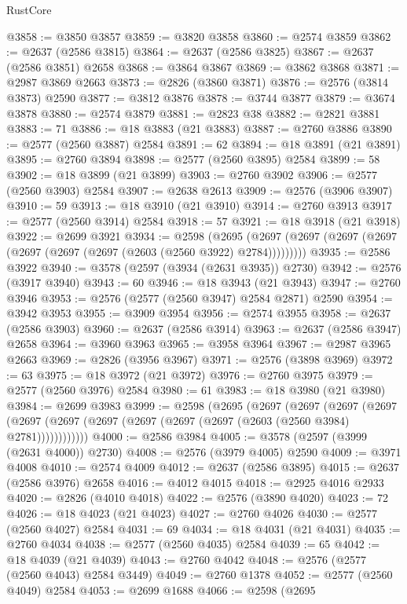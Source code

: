 \begin{lexlean}{RustCore}
\begin{coremodule}
@3858 := @3850 @3857
@3859 := @3820 @3858
@3860 := @2574 @3859
@3862 := @2637 (@2586 @3815)
@3864 := @2637 (@2586 @3825)
@3867 := @2637 (@2586 @3851) @2658
@3868 := @3864 @3867
@3869 := @3862 @3868
@3871 := @2987 @3869 @2663
@3873 := @2826 (@3860 @3871)
@3876 := @2576 (@3814 @3873) @2590
@3877 := @3812 @3876
@3878 := @3744 @3877
@3879 := @3674 @3878
@3880 := @2574 @3879
@3881 := @2823 @38
@3882 := @2821 @3881
@3883 := 71
@3886 := @18 @3883 (@21 @3883)
@3887 := @2760 @3886
@3890 := @2577 (@2560 @3887) @2584
@3891 := 62
@3894 := @18 @3891 (@21 @3891)
@3895 := @2760 @3894
@3898 := @2577 (@2560 @3895) @2584
@3899 := 58
@3902 := @18 @3899 (@21 @3899)
@3903 := @2760 @3902
@3906 := @2577 (@2560 @3903) @2584
@3907 := @2638 @2613
@3909 := @2576 (@3906 @3907)
@3910 := 59
@3913 := @18 @3910 (@21 @3910)
@3914 := @2760 @3913
@3917 := @2577 (@2560 @3914) @2584
@3918 := 57
@3921 := @18 @3918 (@21 @3918)
@3922 := @2699 @3921
@3934 := @2598
    (@2695 (@2697 (@2697 (@2697 (@2697 (@2697 (@2697 (@2697 (@2603 (@2560 @3922) @2784)))))))))
@3935 := @2586 @3922
@3940 := @3578 (@2597 (@3934 (@2631 @3935)) @2730)
@3942 := @2576 (@3917 @3940)
@3943 := 60
@3946 := @18 @3943 (@21 @3943)
@3947 := @2760 @3946
@3953 := @2576 (@2577 (@2560 @3947) @2584 @2871) @2590
@3954 := @3942 @3953
@3955 := @3909 @3954
@3956 := @2574 @3955
@3958 := @2637 (@2586 @3903)
@3960 := @2637 (@2586 @3914)
@3963 := @2637 (@2586 @3947) @2658
@3964 := @3960 @3963
@3965 := @3958 @3964
@3967 := @2987 @3965 @2663
@3969 := @2826 (@3956 @3967)
@3971 := @2576 (@3898 @3969)
@3972 := 63
@3975 := @18 @3972 (@21 @3972)
@3976 := @2760 @3975
@3979 := @2577 (@2560 @3976) @2584
@3980 := 61
@3983 := @18 @3980 (@21 @3980)
@3984 := @2699 @3983
@3999 := @2598
    (@2695
      (@2697
        (@2697
          (@2697
            (@2697 (@2697 (@2697 (@2697 (@2697 (@2697 (@2697 (@2603 (@2560 @3984) @2781))))))))))))
@4000 := @2586 @3984
@4005 := @3578 (@2597 (@3999 (@2631 @4000)) @2730)
@4008 := @2576 (@3979 @4005) @2590
@4009 := @3971 @4008
@4010 := @2574 @4009
@4012 := @2637 (@2586 @3895)
@4015 := @2637 (@2586 @3976) @2658
@4016 := @4012 @4015
@4018 := @2925 @4016 @2933
@4020 := @2826 (@4010 @4018)
@4022 := @2576 (@3890 @4020)
@4023 := 72
@4026 := @18 @4023 (@21 @4023)
@4027 := @2760 @4026
@4030 := @2577 (@2560 @4027) @2584
@4031 := 69
@4034 := @18 @4031 (@21 @4031)
@4035 := @2760 @4034
@4038 := @2577 (@2560 @4035) @2584
@4039 := 65
@4042 := @18 @4039 (@21 @4039)
@4043 := @2760 @4042
@4048 := @2576 (@2577 (@2560 @4043) @2584 @3449)
@4049 := @2760 @1378
@4052 := @2577 (@2560 @4049) @2584
@4053 := @2699 @1688
@4066 := @2598
    (@2695

\end{coremodule}
\end{lexlean}
